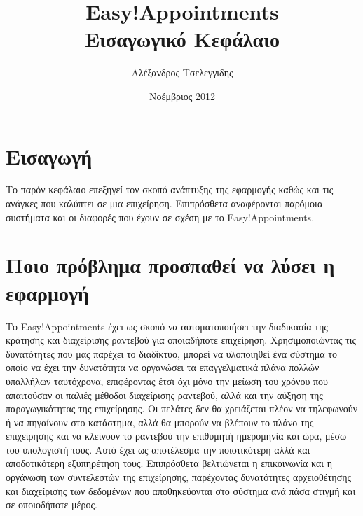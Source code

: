 \documentclass[12pt]{article}
\title{{\Huge {\bf Easy!Appointments}} \\[0.3cm] Εισαγωγικό Κεφάλαιο}
\author{Αλέξανδρος Τσελεγγιδης}
\date{Νοέμβριος 2012}
\begin{document}
\maketitle 
\thispagestyle{empty} %
\pagebreak

\section* {Εισαγωγή} %
Το παρόν κεφάλαιο επεξηγεί τον σκοπό ανάπτυξης της εφαρμογής καθώς και τις ανάγκες που καλύπτει σε μια επιχείρηση. Επιπρόσθετα αναφέρονται παρόμοια συστήματα και οι διαφορές που έχουν σε σχέση με το Easy!Appointments. 

\section {Ποιο πρόβλημα προσπαθεί να λύσει η εφαρμογή}
Το Easy!Appointments έχει ως σκοπό να αυτοματοποιήσει την διαδικασία της κράτησης και διαχείρισης ραντεβού για οποιαδήποτε επιχείρηση. Χρησιμοποιώντας τις δυνατότητες που μας παρέχει το διαδίκτυο, μπορεί να υλοποιηθεί ένα  σύστημα το οποίο να έχει την δυνατότητα να οργανώσει τα επαγγελματικά πλάνα πολλών υπαλλήλων ταυτόχρονα, επιφέροντας έτσι όχι μόνο την μείωση του χρόνου που απαιτούσαν οι παλιές μέθοδοι διαχείρισης ραντεβού, αλλά και την αύξηση της παραγωγικότητας της επιχείρησης. Οι πελάτες δεν θα χρειάζεται πλέον να τηλεφωνούν ή να πηγαίνουν στο κατάστημα, αλλά θα μπορούν να βλέπουν το πλάνο της επιχείρησης και να κλείνουν το ραντεβού την επιθυμητή ημερομηνία και ώρα, μέσω του υπολογιστή τους. Αυτό έχει ως αποτέλεσμα την ποιοτικότερη αλλά και αποδοτικότερη εξυπηρέτηση τους. Επιπρόσθετα βελτιώνεται η επικοινωνία και η οργάνωση των συντελεστών της επιχείρησης, παρέχοντας δυνατότητες αρχειοθέτησης και διαχείρισης των δεδομένων που αποθηκεύονται στο σύστημα ανά πάσα στιγμή και σε οποιοδήποτε μέρος.

\end{document}
